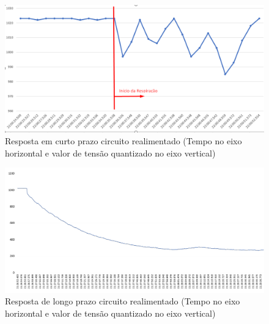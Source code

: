 \begin{figure}[h!]
	\begin{center}
		\includegraphics[width=1\linewidth]{images/RespostaCircuitoRealimentado.png}
		\caption{Resposta em curto prazo circuito realimentado (Tempo no eixo horizontal e valor de tensão quantizado no eixo vertical)}
		\label{fig:RespostaCircuitoRealimentado}
	\end{center}
\end{figure}

\begin{figure}[h!]
	\begin{center}
		\includegraphics[width=1\linewidth]{images/DecaimentoRespiracaoMascara.png}
		\caption{Resposta de longo prazo circuito realimentado (Tempo no eixo horizontal e valor de tensão quantizado no eixo vertical)}
		\label{fig:RespostaCircuitoRealimentadoLongoPrazo}
	\end{center}
\end{figure}

